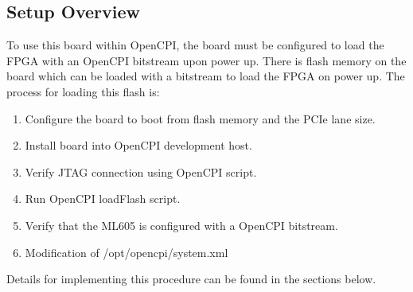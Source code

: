 \subsection{Setup Overview}
To use this board within OpenCPI, the board must be configured to load the FPGA with an OpenCPI bitstream upon power up. There is flash memory on the board which can be loaded with a bitstream to load the FPGA on power up. The process for loading this flash is:
\begin{enumerate}
	\item Configure the board to boot from flash memory and the PCIe lane size.
	\item Install board into OpenCPI development host.
	\item Verify JTAG connection using OpenCPI script.
	\item Run OpenCPI loadFlash script.
	\item Verify that the ML605 is configured with a OpenCPI bitstream.
	\item Modification of /opt/opencpi/system.xml
\end{enumerate}
Details for implementing this procedure can be found in the sections below.

\pagebreak
